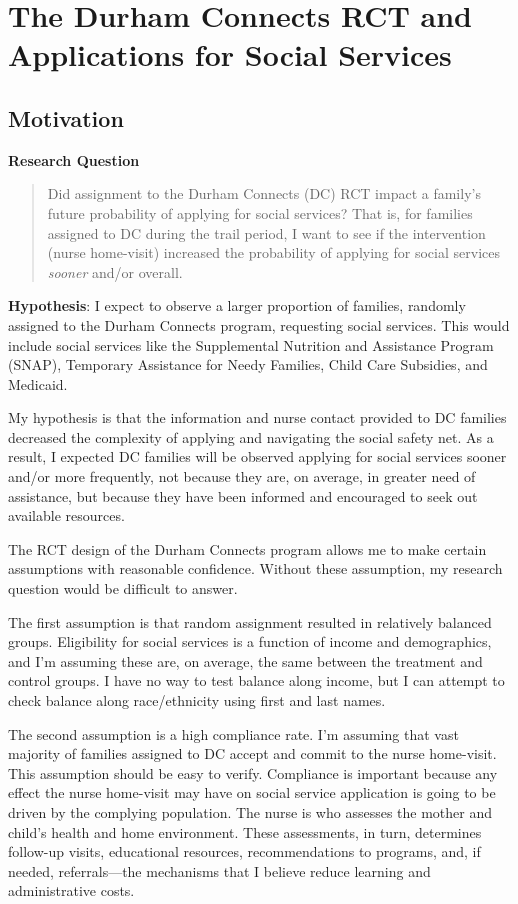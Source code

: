 \documentclass[12pt,letterpaperpaper,]{book}
\begin{document}
\chapter{The Durham Connects RCT and Applications for Social
Services}\label{chapter-2}

\section*{Motivation}\label{motivation-1}

\textbf{Research Question}

\begin{quote}
Did assignment to the Durham Connects (DC) RCT impact a family's future
probability of applying for social services? That is, for families
assigned to DC during the trail period, I want to see if the
intervention (nurse home-visit) increased the probability of applying
for social services \emph{sooner} and/or overall.
\end{quote}

\textbf{Hypothesis}: I expect to observe a larger proportion of
families, randomly assigned to the Durham Connects program, requesting
social services. This would include social services like the
Supplemental Nutrition and Assistance Program (SNAP), Temporary
Assistance for Needy Families, Child Care Subsidies, and Medicaid.

My hypothesis is that the information and nurse contact provided to DC
families decreased the complexity of applying and navigating the social
safety net. As a result, I expected DC families will be observed
applying for social services sooner and/or more frequently, not because
they are, on average, in greater need of assistance, but because they
have been informed and encouraged to seek out available resources.

The RCT design of the Durham Connects program allows me to make certain
assumptions with reasonable confidence. Without these assumption, my
research question would be difficult to answer.

The first assumption is that random assignment resulted in relatively
balanced groups. Eligibility for social services is a function of income
and demographics, and I'm assuming these are, on average, the same
between the treatment and control groups. I have no way to test balance
along income, but I can attempt to check balance along race/ethnicity
using first and last names.

The second assumption is a high compliance rate. I'm assuming that vast
majority of families assigned to DC accept and commit to the nurse
home-visit. This assumption should be easy to verify. Compliance is
important because any effect the nurse home-visit may have on social
service application is going to be driven by the complying population.
The nurse is who assesses the mother and child's health and home
environment. These assessments, in turn, determines follow-up visits,
educational resources, recommendations to programs, and, if needed,
referrals---the mechanisms that I believe reduce learning and
administrative costs.
\end{document}
